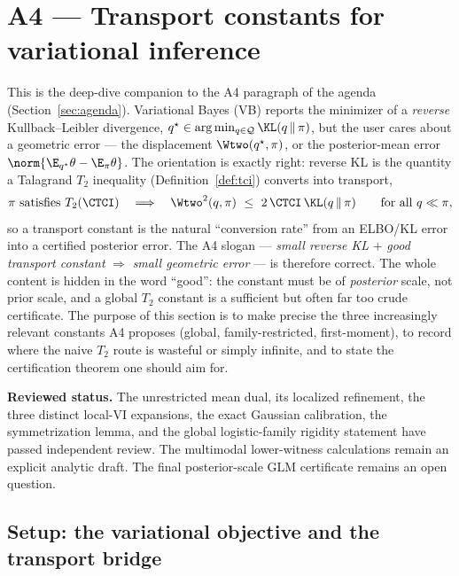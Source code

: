 \documentclass[../../main.tex]{subfiles}
\begin{document}
\section{A4 --- Transport constants for variational inference}
\label{sec:a4}

This is the deep-dive companion to the A4 paragraph of the agenda (Section~\ref{sec:agenda}).
Variational Bayes (VB) reports the minimizer of a \emph{reverse} Kullback--Leibler divergence,
$q^\star\in\arg\min_{q\in\mathcal Q}\KL(q\,\|\,\pi)$, but the user cares about a geometric error
--- the displacement $\Wtwo(q^\star,\pi)$, or the posterior-mean error
$\norm{\E_{q^\star}\theta-\E_\pi\theta}$. The orientation is exactly right: reverse KL is the
quantity a Talagrand $T_2$ inequality (Definition~\ref{def:tci}) converts into transport,
\begin{equation}\label{eq:a4-bridge}
  \pi\ \text{satisfies}\ T_2(\CTCI)
  \quad\Longrightarrow\quad
  \Wtwo^2(q,\pi)\ \le\ 2\,\CTCI\,\KL(q\,\|\,\pi)
  \qquad\text{for all } q\ll\pi,
\end{equation}
so a transport constant is the natural ``conversion rate'' from an ELBO/KL error into a certified
posterior error. The A4 slogan --- \emph{small reverse KL} $+$ \emph{good transport constant}
$\Rightarrow$ \emph{small geometric error} --- is therefore correct. The whole content is hidden
in the word ``good'': the constant must be of \emph{posterior} scale, not prior scale, and a
global $T_2$ constant is a sufficient but often far too crude certificate. The purpose of this
section is to make precise the three increasingly relevant constants A4 proposes (global,
family-restricted, first-moment), to record where the naive $T_2$ route is wasteful or simply
infinite, and to state the certification theorem one should aim for.

\noindent\textbf{Reviewed status.}
The unrestricted mean dual, its localized refinement, the three distinct local-VI expansions,
the exact Gaussian calibration, the symmetrization lemma, and the global logistic-family rigidity
statement have passed independent review. The multimodal lower-witness calculations remain an
explicit analytic draft. The final posterior-scale GLM certificate remains an open question.

\subsection{Setup: the variational objective and the transport bridge}
\label{subsec:a4-setup}
\end{document}
